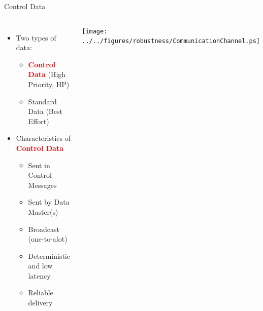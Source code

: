 \documentclass[compress,red]{beamer}
\begin{document}
\begin{frame}{Control Data}

\begin{columns}[c]
    \begin{itemize}
      \item Two types of data:
	  \begin{itemize}
	    \item \textcolor{red}{\bf Control Data} (High Priority, HP)
	    \item Standard Data (Best Effort)
	  \end{itemize}
	  \item Characteristics of \textcolor{red}{\bf Control Data}
	  \begin{itemize}
	    \item Sent in Control Messages
	    \item Sent by Data Master(s)
	    \item Broadcast (one-to-alot)
	    \item Deterministic and low latency
	    \item Reliable delivery
	  \end{itemize}
    \end{itemize}
    \begin{center}
    \texttt{[image: ../../figures/robustness/CommunicationChannel.ps]}
    \end{center}

\end{columns}

\end{frame}
\end{document}
